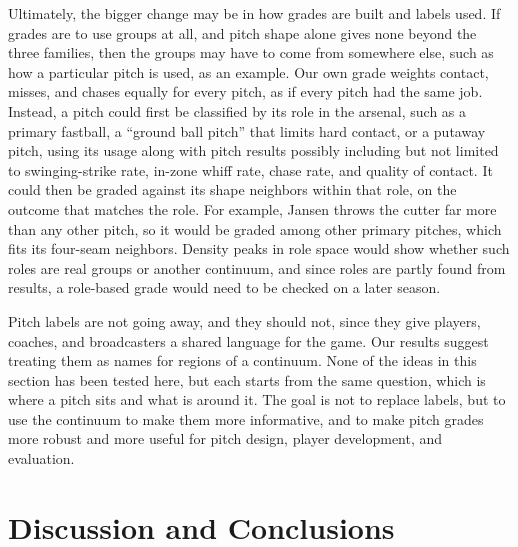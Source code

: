 \documentclass[11pt]{article}
\theoremstyle{definition}
\theoremstyle{remark}
\begin{document}
Ultimately, the bigger change may be in how grades are built and labels used.
If grades are to use groups at all, and pitch shape alone gives none beyond the three families, then the groups may have to come from somewhere else, such as how a particular pitch is used, as an example.
Our own grade weights contact, misses, and chases equally for every pitch, as if every pitch had the same job.
Instead, a pitch could first be classified by its role in the arsenal, such as a primary fastball, a ``ground ball pitch'' that limits hard contact, or a putaway pitch, using its usage along with pitch results possibly including but not limited to swinging-strike rate, in-zone whiff rate, chase rate, and quality of contact.
It could then be graded against its shape neighbors within that role, on the outcome that matches the role.
For example, Jansen throws the cutter far more than any other pitch, so it would be graded among other primary pitches, which fits its four-seam neighbors.
Density peaks in role space would show whether such roles are real groups or another continuum, and since roles are partly found from results, a role-based grade would need to be checked on a later season.

Pitch labels are not going away, and they should not, since they give players, coaches, and broadcasters a shared language for the game.
Our results suggest treating them as names for regions of a continuum.
None of the ideas in this section has been tested here, but each starts from the same question, which is where a pitch sits and what is around it.
The goal is not to replace labels, but to use the continuum to make them more informative, and to make pitch grades more robust and more useful for pitch design, player development, and evaluation.

\section{Discussion and Conclusions}\label{sec:discussion}
\end{document}
